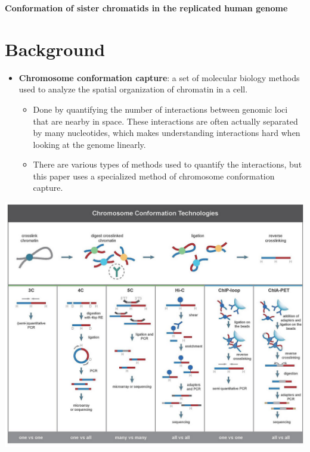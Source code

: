 \documentclass[plain,basic]{inVerba-notes}
\begin{document}
    

\begin{center}
    \textbf{\LARGE{Conformation of sister chromatids in the 
    replicated human genome}}
\end{center}

\section{Background}
\begin{itemize}
    \item \textbf{Chromosome conformation capture}: a set of molecular biology methods used to analyze the spatial organization of chromatin in a cell. 
        \begin{itemize}
            \item Done by quantifying the number of interactions between genomic loci that are nearby in space. These interactions are often actually separated by many nucleotides, which makes understanding interactions hard when looking at the genome linearly. 
            \item There are various types of methods used to quantify the interactions, but this paper uses a specialized method of chromosome conformation capture.
        \end{itemize}
    \end{itemize}

    \begin{center}
        \includegraphics[scale=0.32]{images/8-3c.png}
    \end{center}
    
\end{document}
